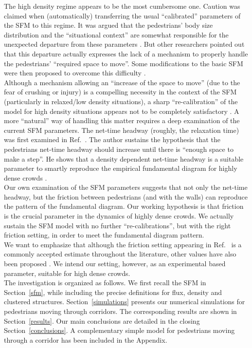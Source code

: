 The high density regime appears to be the most cumbersome one. Caution was 
claimed when (automatically) transferring the usual ``calibrated'' parameters 
of the SFM to this regime. It was argued that the pedestrians' body size 
distribution and the ``situational context'' are somewhat responsible for the 
unexpected departure from these parameters \cite{johansson1,kwak}. But other 
researchers pointed out that this departure actually expresses the lack of a 
mechanism to properly handle the pedestrians' ``required space to move''. Some 
modifications to the basic SFM were then proposed to overcome this difficulty 
\cite{parisi2,seyfried2}. \\

Although a mechanism allowing an ``increase of the space to move'' (due to the 
fear of crushing or injury) is a compelling necessity in the context of the SFM
(particularly in relaxed/low density situations), 
a sharp ``re-calibration'' of the model for high density situations appears not 
to be completely satisfactory \cite{johansson}. A more ``natural'' way of 
handling this matter requires a deep examination of the current SFM parameters. 
The net-time headway (roughly, the relaxation time) was first examined in 
Ref.~\cite{johansson}. The author sustains the hypothesis that the 
pedestrians net-time headway should increase until there is ``enough space to 
make a step''.  He shows that a density dependent net-time headway is a 
suitable parameter to smartly reproduce the empirical fundamental diagram for 
highly dense crowds \cite{johansson}.  \\ 

Our own examination of the SFM parameters suggests that not only the net-time 
headway, but the friction between pedestrians (and with the walls) can 
reproduce the pattern of the fundamental diagram. Our working hypothesis is 
that friction is the crucial parameter in the dynamics of highly dense crowds. 
We actually sustain the SFM model with no further ``re-calibrations'', but 
with the right friction setting, in order to meet the fundamental diagram 
pattern. \\  

We want to emphasize that although the friction setting appearing in 
Ref.~\cite{Helbing1} is a commonly accepted estimate throughout the  
literature, other values have also been proposed \cite{colombi2017}. We 
intend our setting, however, as an experimental based parameter, suitable for 
high dense crowds. \\

The investigation is organized as follows. We first recall the SFM in 
Section~\ref{sfm}, while including the precise definitions for flux, density 
and clustered structures. Section~\ref{simulations} presents our numerical 
simulations for pedestrians moving through corridors. The corresponding results 
are shown in Section~\ref{results}. Our main conclusions are detailed in the 
closing Section~\ref{conclusions}. A complementary simple model for pedestrians 
moving through a corridor has been included in the Appendix. \\     

